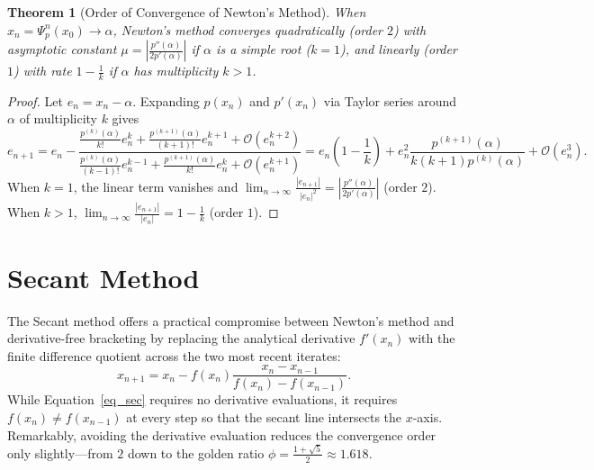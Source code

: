 \documentclass{amsart}
\newtheorem{theorem}{Theorem}
\begin{document}
\begin{theorem}[Order of Convergence of Newton's Method]
    When $x_n = \Psi_p^n(x_0) \to \alpha$, Newton's method converges quadratically (order $2$) with asymptotic constant $\mu = \left|\frac{p''(\alpha)}{2p'(\alpha)}\right|$ if $\alpha$ is a simple root ($k=1$), and linearly (order $1$) with rate $1 - \frac{1}{k}$ if $\alpha$ has multiplicity $k > 1$.
\end{theorem}
\begin{proof}
    Let $e_n = x_n - \alpha$. Expanding $p(x_n)$ and $p'(x_n)$ via Taylor series around $\alpha$ of multiplicity $k$ gives
    \[
        e_{n+1} = e_n - \frac{\frac{p^{(k)}(\alpha)}{k!}e_n^k + \frac{p^{(k+1)}(\alpha)}{(k+1)!}e_n^{k+1} + \mathcal{O}(e_n^{k+2})}{\frac{p^{(k)}(\alpha)}{(k-1)!}e_n^{k-1} + \frac{p^{(k+1)}(\alpha)}{k!}e_n^k + \mathcal{O}(e_n^{k+1})}
        = e_n\left(1 - \frac{1}{k}\right) + e_n^2 \frac{p^{(k+1)}(\alpha)}{k(k+1)p^{(k)}(\alpha)} + \mathcal{O}(e_n^3).
    \]
    When $k=1$, the linear term vanishes and $\lim_{n\to\infty} \frac{|e_{n+1}|}{|e_n|^2} = \left|\frac{p''(\alpha)}{2p'(\alpha)}\right|$ (order $2$). When $k > 1$, $\lim_{n\to\infty} \frac{|e_{n+1}|}{|e_n|} = 1 - \frac{1}{k}$ (order $1$).
\end{proof}

\section{Secant Method}\label{sec_sec}

The Secant method offers a practical compromise between Newton's method and derivative-free bracketing by replacing the analytical derivative $f'(x_n)$ with the finite difference quotient across the two most recent iterates:
\begin{equation}\label{eq_sec}
    x_{n+1} = x_n - f(x_n)\frac{x_n - x_{n-1}}{f(x_n) - f(x_{n-1})}.
\end{equation}
While Equation~\eqref{eq_sec} requires no derivative evaluations, it requires $f(x_n) \neq f(x_{n-1})$ at every step so that the secant line intersects the $x$-axis. Remarkably, avoiding the derivative evaluation reduces the convergence order only slightly—from $2$ down to the golden ratio $\phi = \frac{1+\sqrt{5}}{2} \approx 1.618$.
\end{document}
